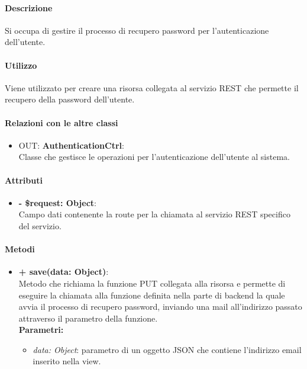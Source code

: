 		\paragraph{Descrizione}
		Si occupa di gestire il processo di recupero password per l'autenticazione dell'utente.
		
		\paragraph{Utilizzo}
		Viene utilizzato per creare una risorsa collegata al servizio REST che permette il recupero della password dell'utente.
		
		\paragraph{Relazioni con le altre classi}
		\begin{itemize}
			\item OUT: \textbf{AuthenticationCtrl}:\\
			Classe che gestisce le operazioni per l'autenticazione dell'utente al sistema.
		\end{itemize}
		
		\paragraph{Attributi}
		\begin{itemize}
			\item \textbf{- \$request: Object}:\\
			Campo dati contenente la route per la chiamata al servizio REST specifico del servizio.
		\end{itemize}	
		
		\paragraph{Metodi}
		\begin{itemize}
			\item \textbf{+ save(data: Object)}:\\
			Metodo che richiama la funzione PUT collegata alla risorsa e permette di eseguire la chiamata alla funzione definita nella parte di backend la quale avvia il processo di recupero password, inviando una mail all'indirizzo passato attraverso il parametro della funzione.\\
			\textbf{Parametri:}\\
			\begin{itemize}
				\item \textit{data: Object}: parametro di un oggetto JSON che contiene l'indirizzo email inserito nella view.
			\end{itemize}
		\end{itemize}
		
